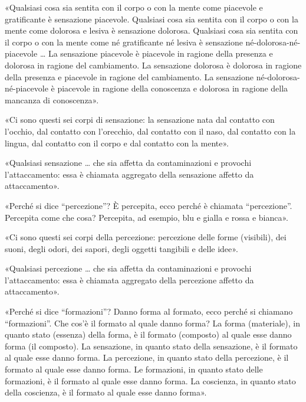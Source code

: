 
«Qualsiasi cosa sia sentita con il corpo o con la mente come piacevole e
gratificante è sensazione piacevole. Qualsiasi cosa sia sentita con il corpo o
con la mente come dolorosa e lesiva è sensazione dolorosa. Qualsiasi cosa sia
sentita con il corpo o con la mente come né gratificante né lesiva è sensazione
né-dolorosa-né-piacevole … La sensazione piacevole è piacevole in ragione della
presenza e dolorosa in ragione del cambiamento. La sensazione dolorosa è
dolorosa in ragione della presenza e piacevole in ragione del cambiamento. La
sensazione né-dolorosa-né-piacevole è piacevole in ragione della conoscenza e
dolorosa in ragione della mancanza di conoscenza».


«Ci sono questi sei corpi di sensazione: la sensazione nata dal contatto con
l’occhio, dal contatto con l’orecchio, dal contatto con il naso, dal contatto
con la lingua, dal contatto con il corpo e dal contatto con la mente».


«Qualsiasi sensazione … che sia affetta da contaminazioni e provochi
l’attaccamento: essa è chiamata aggregato della sensazione affetto da
attaccamento».


«Perché si dice “percezione”? È percepita, ecco perché è chiamata “percezione”.
Percepita come che cosa? Percepita, ad esempio, blu e gialla e rossa e bianca».


«Ci sono questi sei corpi della percezione: percezione delle forme (visibili),
dei suoni, degli odori, dei sapori, degli oggetti tangibili e delle idee».


«Qualsiasi percezione … che sia affetta da contaminazioni e provochi
l’attaccamento: essa è chiamata aggregato della percezione affetto da
attaccamento».


«Perché si dice “formazioni”? Danno forma al formato, ecco perché si chiamano
“formazioni”. Che cos’è il formato al quale danno forma? La forma (materiale),
in quanto stato (essenza) della forma, è il formato (composto) al quale esse
danno forma (il composto). La sensazione, in quanto stato della sensazione, è il
formato al quale esse danno forma. La percezione, in quanto stato della
percezione, è il formato al quale esse danno forma. Le formazioni, in quanto
stato delle formazioni, è il formato al quale esse danno forma. La coscienza, in
quanto stato della coscienza, è il formato al quale esse danno
forma».

